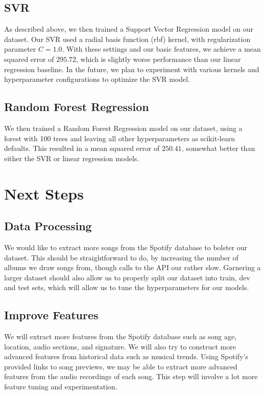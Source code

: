 \documentclass[journal]{IEEEtran}
\begin{document}
\subsection{SVR}
As described above, we then trained a Support Vector Regression model on our dataset. Our SVR used a radial basis function (rbf) kernel, with regularization parameter $C = 1.0$. With these settings and our basic features, we achieve a mean squared error of $295.72$, which is slightly worse performance than our linear regression baseline. In the future, we plan to experiment with various kernels and hyperparameter configurations to optimize the SVR model.

\subsection{Random Forest Regression}
We then trained a Random Forest Regression model on our dataset, using a forest with 100 trees and leaving all other hyperparameters as scikit-learn defaults. This resulted in a mean squared error of $250.41$, somewhat better than either the SVR or linear regression models.


\section{Next Steps}

\subsection{Data Processing}
We would like to extract more songs from the Spotify database to bolster our dataset. This should be straightforward to do, by increasing the number of albums we draw songs from, though calls to the API our rather slow. Garnering a larger dataset should also allow us to properly split our dataset into train, dev and test sets, which will allow us to tune the hyperparameters for our models.

\subsection{Improve Features}
We will extract more features from the Spotify database such as song age, location, audio sections, and signature. We will also try to construct more advanced features from historical data such as musical trends. Using Spotify's provided links to song previews, we may be able to extract more advanced features from the audio recordings of each song. This step will involve a lot more feature tuning and experimentation.
\end{document}
